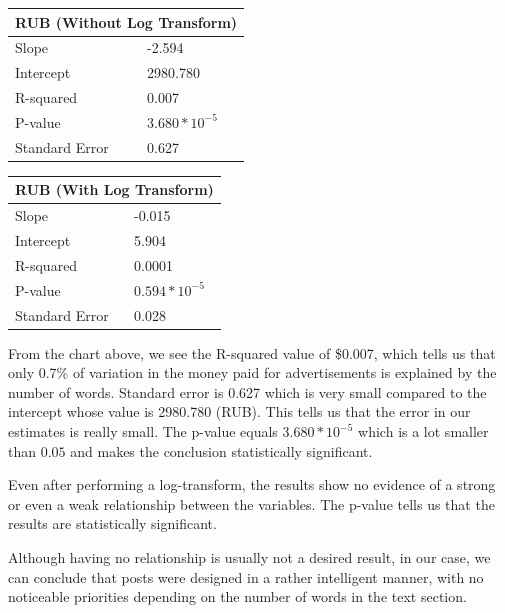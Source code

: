 \documentclass[12pt]{article}
\theoremstyle{definition}
\begin{document}
\begin{center}
\begin{tabular}{|p{3cm}|p{3cm}|}
 \hline
 \multicolumn{2}{|c|}{RUB (Without Log Transform)}\\
 \hline
 Slope          & -2.594\\
 \hline
 Intercept      & 2980.780\\
 \hline
 R-squared      & 0.007\\
 \hline
 P-value        & $3.680 * 10^{-5}$\\
 \hline
 Standard Error & 0.627\\
 \hline
\end{tabular}
\qquad
\begin{tabular}{|p{3cm}|p{3cm}|}
 \hline
 \multicolumn{2}{|c|}{RUB (With Log Transform)}\\
 \hline
 Slope          & -0.015\\
 \hline
 Intercept      & 5.904\\
 \hline
 R-squared      & 0.0001\\
 \hline
 P-value        & $0.594 * 10^{-5}$\\
 \hline
 Standard Error & 0.028\\
 \hline
\end{tabular}
\end{center}

\bigskip

From the chart above, we see the R-squared value of \$0.007, which tells us
that only 0.7\% of variation in the money paid for advertisements is explained
by the number of words. Standard error is 0.627 which is very small compared
to the intercept whose value is 2980.780 (RUB). This tells us that the error
in our estimates is really small. The p-value equals $3.680 * 10^{-5}$ which
is a lot smaller than $0.05$ and makes the conclusion statistically significant.

\bigskip

Even after performing a log-transform, the results show no evidence of a strong
or even a weak relationship between the variables. The p-value tells us that
the results are statistically significant.

\bigskip

Although having no relationship is usually not a desired result, in our case,
we can conclude that posts were designed in a rather intelligent manner, with
no noticeable priorities depending on the number of words in the text section.

\end{document}
